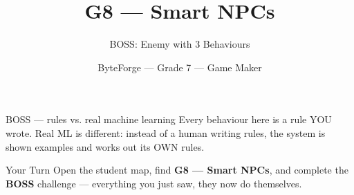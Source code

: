 \documentclass[aspectratio=169]{beamer}
\title{G8 — Smart NPCs}
\subtitle{BOSS: Enemy with 3 Behaviours}
\author{ByteForge --- Grade 7 --- Game Maker}
\date{}
\begin{document}
\begin{frame}
    \titlepage
\end{frame}

\begin{frame}{BOSS — rules vs. real machine learning}
    \Large
    Every behaviour here is a rule YOU wrote. Real ML is different: instead of a human writing rules, the system is shown examples and works out its OWN rules.

    \begin{center}
    \end{center}
\end{frame}

\begin{frame}{Your Turn}
    \Large
    Open the student map, find \textbf{G8 — Smart NPCs}, and complete
    the \textbf{BOSS} challenge --- everything you just saw, they now do themselves.
\end{frame}
\end{document}
